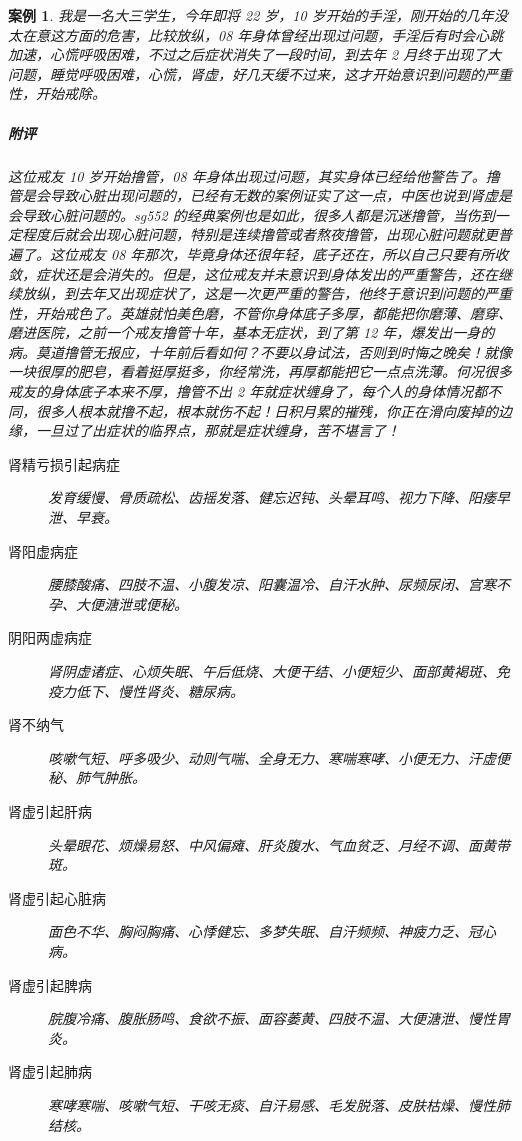 \documentclass{ctexart}
\newtheorem{case}{案例}
\begin{document}
\begin{case}
    我是一名大三学生，今年即将 22 岁，10 岁开始的手淫，刚开始的几年没太在意这方面的危害，比较放纵，08 年身体曾经出现过问题，手淫后有时会心跳加速，心慌呼吸困难，不过之后症状消失了一段时间，到去年 2 月终于出现了大问题，睡觉呼吸困难，心慌，肾虚，好几天缓不过来，这才开始意识到问题的严重性，开始戒除。
    \subparagraph{附评} 这位戒友 10 岁开始撸管，08 年身体出现过问题，其实身体已经给他警告了。撸管是会导致心脏出现问题的，已经有无数的案例证实了这一点，中医也说到肾虚是会导致心脏问题的。sg552 的经典案例也是如此，很多人都是沉迷撸管，当伤到一定程度后就会出现心脏问题，特别是连续撸管或者熬夜撸管，出现心脏问题就更普遍了。这位戒友 08 年那次，毕竟身体还很年轻，底子还在，所以自己只要有所收敛，症状还是会消失的。但是，这位戒友并未意识到身体发出的严重警告，还在继续放纵，到去年又出现症状了，这是一次更严重的警告，他终于意识到问题的严重性，开始戒色了。英雄就怕美色磨，不管你身体底子多厚，都能把你磨薄、磨穿、磨进医院，之前一个戒友撸管十年，基本无症状，到了第 12 年，爆发出一身的病。莫道撸管无报应，十年前后看如何？不要以身试法，否则到时悔之晚矣！就像一块很厚的肥皂，看着挺厚挺多，你经常洗，再厚都能把它一点点洗薄。何况很多戒友的身体底子本来不厚，撸管不出 2 年就症状缠身了，每个人的身体情况都不同，很多人根本就撸不起，根本就伤不起！日积月累的摧残，你正在滑向废掉的边缘，一旦过了出症状的临界点，那就是症状缠身，苦不堪言了！

    \begin{description}
        \item[肾精亏损引起病症] 发育缓慢、骨质疏松、齿摇发落、健忘迟钝、头晕耳鸣、视力下降、阳痿早泄、早衰。
        \item[肾阳虚病症] 腰膝酸痛、四肢不温、小腹发凉、阳囊温冷、自汗水肿、尿频尿闭、宫寒不孕、大便溏泄或便秘。
        \item[阴阳两虚病症] 肾阴虚诸症、心烦失眠、午后低烧、大便干结、小便短少、面部黄褐斑、免疫力低下、慢性肾炎、糖尿病。
        \item[肾不纳气] 咳嗽气短、呼多吸少、动则气喘、全身无力、寒喘寒哮、小便无力、汗虚便秘、肺气肿胀。
        \item[肾虚引起肝病] 头晕眼花、烦燥易怒、中风偏瘫、肝炎腹水、气血贫乏、月经不调、面黄带斑。
        \item[肾虚引起心脏病] 面色不华、胸闷胸痛、心悸健忘、多梦失眠、自汗频频、神疲力乏、冠心病。
        \item[肾虚引起脾病] 脘腹冷痛、腹胀肠鸣、食欲不振、面容萎黄、四肢不温、大便溏泄、慢性胃炎。
        \item[肾虚引起肺病] 寒哮寒喘、咳嗽气短、干咳无痰、自汗易感、毛发脱落、皮肤枯燥、慢性肺结核。
    \end{description}
\end{case}
\end{document}
